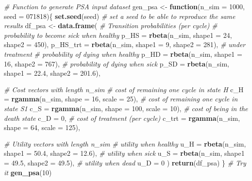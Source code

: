 \documentclass[
]{article}
\newenvironment{Shaded}{\begin{snugshade}}{\end{snugshade}}
\newcommand{\CommentTok}[1]{\textcolor[rgb]{0.56,0.35,0.01}{\textit{#1}}}
\newcommand{\ControlFlowTok}[1]{\textcolor[rgb]{0.13,0.29,0.53}{\textbf{#1}}}
\newcommand{\DataTypeTok}[1]{\textcolor[rgb]{0.13,0.29,0.53}{#1}}
\newcommand{\DecValTok}[1]{\textcolor[rgb]{0.00,0.00,0.81}{#1}}
\newcommand{\FloatTok}[1]{\textcolor[rgb]{0.00,0.00,0.81}{#1}}
\newcommand{\KeywordTok}[1]{\textcolor[rgb]{0.13,0.29,0.53}{\textbf{#1}}}
\newcommand{\NormalTok}[1]{#1}
\newcommand{\StringTok}[1]{\textcolor[rgb]{0.31,0.60,0.02}{#1}}
\begin{document}
\begin{Shaded}
\begin{Highlighting}[]
\CommentTok{# Function to generate PSA input dataset}
\NormalTok{gen_psa <-}\StringTok{ }\ControlFlowTok{function}\NormalTok{(}\DataTypeTok{n_sim =} \DecValTok{1000}\NormalTok{, }\DataTypeTok{seed =} \DecValTok{071818}\NormalTok{)\{}
  \KeywordTok{set.seed}\NormalTok{(seed) }\CommentTok{# set a seed to be able to reproduce the same results}
\NormalTok{  df_psa <-}\StringTok{ }\KeywordTok{data.frame}\NormalTok{(}
    \CommentTok{# Transition probabilities (per cycle)}
    \CommentTok{# probability to become sick when healthy}
    \DataTypeTok{p_HS     =} \KeywordTok{rbeta}\NormalTok{(n_sim, }\DataTypeTok{shape1 =} \DecValTok{24}\NormalTok{, }\DataTypeTok{shape2 =} \DecValTok{450}\NormalTok{), }
    \DataTypeTok{p_HS_trt =} \KeywordTok{rbeta}\NormalTok{(n_sim, }\DataTypeTok{shape1 =} \DecValTok{9}\NormalTok{,  }\DataTypeTok{shape2 =} \DecValTok{281}\NormalTok{),   }\CommentTok{# under treatment}
    \CommentTok{# probability of dying when healthy}
    \DataTypeTok{p_HD     =} \KeywordTok{rbeta}\NormalTok{(n_sim, }\DataTypeTok{shape1 =} \DecValTok{16}\NormalTok{, }\DataTypeTok{shape2 =} \DecValTok{767}\NormalTok{),}
    \CommentTok{# probability of dying when sick}
    \DataTypeTok{p_SD     =} \KeywordTok{rbeta}\NormalTok{(n_sim, }\DataTypeTok{shape1 =} \FloatTok{22.4}\NormalTok{, }\DataTypeTok{shape2 =} \FloatTok{201.6}\NormalTok{), }

    \CommentTok{# Cost vectors with length n_sim}
    \CommentTok{# cost of remaining one cycle in state H}
    \DataTypeTok{c_H      =} \KeywordTok{rgamma}\NormalTok{(n_sim, }\DataTypeTok{shape =} \DecValTok{16}\NormalTok{, }\DataTypeTok{scale =} \DecValTok{25}\NormalTok{), }
    \CommentTok{# cost of remaining one cycle in state S1}
    \DataTypeTok{c_S      =} \KeywordTok{rgamma}\NormalTok{(n_sim, }\DataTypeTok{shape =} \DecValTok{100}\NormalTok{, }\DataTypeTok{scale =} \DecValTok{10}\NormalTok{), }
    \CommentTok{# cost of being in the death state}
    \DataTypeTok{c_D      =} \DecValTok{0}\NormalTok{, }
    \CommentTok{# cost of treatment (per cycle)}
    \DataTypeTok{c_trt    =} \KeywordTok{rgamma}\NormalTok{(n_sim, }\DataTypeTok{shape =} \DecValTok{64}\NormalTok{, }\DataTypeTok{scale =} \DecValTok{125}\NormalTok{),}
    
    \CommentTok{# Utility vectors with length n_sim }
    \CommentTok{# utility when healthy}
    \DataTypeTok{u_H      =} \KeywordTok{rbeta}\NormalTok{(n_sim, }\DataTypeTok{shape1 =}  \FloatTok{50.4}\NormalTok{, }\DataTypeTok{shape2 =} \FloatTok{12.6}\NormalTok{), }
    \CommentTok{# utility when sick}
    \DataTypeTok{u_S      =} \KeywordTok{rbeta}\NormalTok{(n_sim, }\DataTypeTok{shape1 =} \FloatTok{49.5}\NormalTok{, }\DataTypeTok{shape2 =} \FloatTok{49.5}\NormalTok{), }
    \CommentTok{# utility when dead}
    \DataTypeTok{u_D      =} \DecValTok{0}                                              
\NormalTok{  )}
  \KeywordTok{return}\NormalTok{(df_psa)}
\NormalTok{\}}
\CommentTok{# Try it}
\KeywordTok{gen_psa}\NormalTok{(}\DecValTok{10}\NormalTok{) }
\end{Highlighting}
\end{Shaded}
\end{document}
